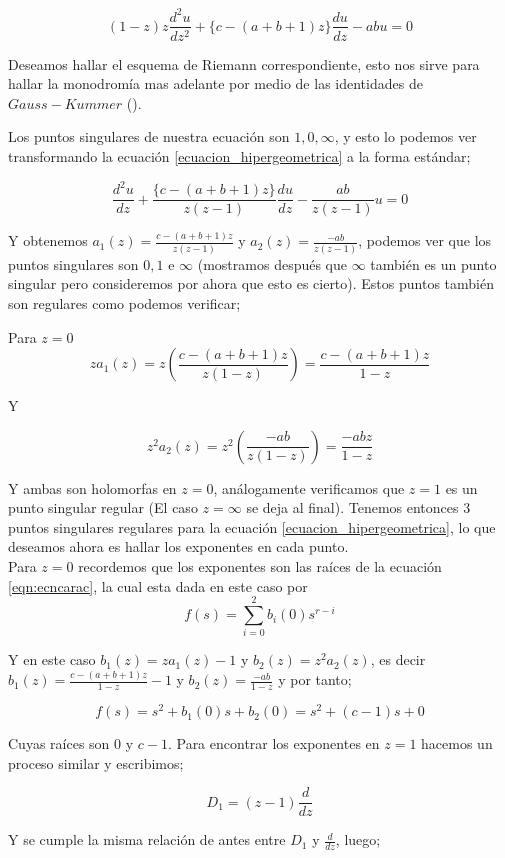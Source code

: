 \begin{equation}
\label{ecuacion_hipergeometrica}
 (1-z )z \frac{d^{2}u}{dz^{2}} + \lbrace  c -(a+b+1)z \rbrace \frac{du}{dz} -abu =0
\end{equation}

Deseamos hallar el esquema de Riemann  correspondiente, esto nos sirve para hallar la monodrom\'ia mas adelante por medio de las identidades de $Gauss-Kummer$ (\cite{gausspainleve}).

Los puntos singulares de nuestra ecuaci\'on son $1,0,\infty$, y esto lo podemos ver transformando la ecuaci\'on \ref{ecuacion_hipergeometrica} a la forma est\'andar;

$$ \frac{d^{2}u}{dz} + \frac{\lbrace c-(a+b+1)z \rbrace}{z(z-1)}\frac{du}{dz} - \frac{ab}{z(z-1)}u=0$$

Y obtenemos $a_{1}(z) = \frac{c- (a+b+1)z}{z(z-1)}$ y $a_{2}(z)=\frac{-ab}{z(z-1)}$, podemos ver que los puntos singulares son $0,1$ e $\infty$ (mostramos despu\'es que $\infty$ tambi\'en es un punto singular pero consideremos por ahora que esto es cierto). Estos puntos tambi\'en son regulares como podemos verificar;

Para $z=0$
$$za_{1}(z) = z (\frac{c-(a+b+1)z}{z(1-z)})= \frac{c-(a+b+1)z}{1-z}$$

Y

$$z^{2}a_{2}(z)=z^{2} (\frac{-ab}{z(1-z)})= \frac{-abz}{1-z}$$

Y ambas son holomorfas en $z=0$, an\'alogamente verificamos que $z=1$ es un punto singular regular (El caso $z= \infty $ se deja al final). Tenemos entonces 3 puntos singulares regulares para la ecuaci\'on \ref{ecuacion_hipergeometrica}, lo que deseamos ahora es hallar los exponentes en cada punto.\\

Para $z=0$ recordemos que los exponentes son las ra\'ices de la ecuaci\'on \ref{eqn:ecncarac}, la cual esta dada en este caso por
$$f(s) = \sum_{i=0}^{2} b_{i}(0) s^{r-i} $$

Y en este caso $b_{1}(z) = za_{1}(z) -1$ y $ b_{2}(z)= z^{2}a_{2}(z)$, es decir $b_{1}(z) = \frac{c-(a+b+1)z}{1-z} -1$ y $b_{2}(z) = \frac{-ab}{1-z}$ y por tanto;

$$f(s)= s^{2} +b_{1}(0)s + b_{2}(0) = s^{2} + (c-1)s +0 $$

Cuyas ra\'ices son 0 y $c-1$. Para encontrar los exponentes en $z=1$ hacemos un proceso similar y escribimos;

$$D_{1} = (z-1)\frac{d}{dz}$$

Y se cumple la misma relaci\'on de antes entre $D_{1}$ y $\frac{d}{dz}$, luego;

